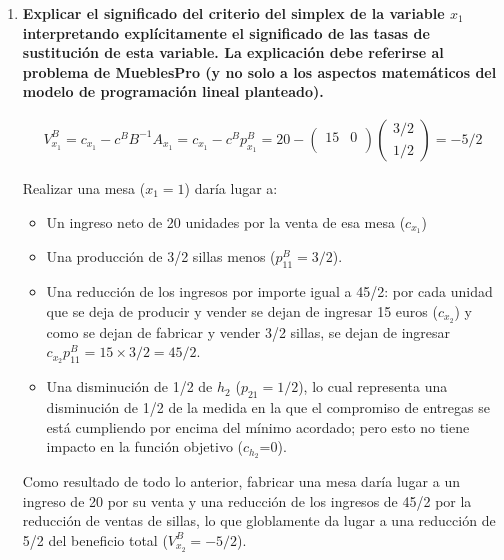 \begin{enumerate}
\item \textbf{Explicar el significado del criterio del simplex de la variable $x_1$ interpretando explícitamente el significado de las tasas de sustitución de esta variable. La explicación debe referirse al problema de MueblesPro (y no solo a los aspectos matemáticos del modelo de programación lineal planteado).}


\begin{equation}
\begin{split}
V^B_{x_1} = c_{x_1}-c^BB^{-1}A_{x_1} = c_{x_1}-c^Bp^B_{x_1}  = 20
 - \begin{pmatrix}
15 & 0\\
\end{pmatrix}
\begin{pmatrix}
3/2 \\ 
1/2 
\end{pmatrix}
 = 
-5/2 
\end{split}
\end{equation}

Realizar una mesa ($x_1 = 1$) daría lugar a:
\begin{itemize}
    \item Un ingreso neto de 20 unidades por la venta de esa mesa ($c_{x_1}$)
    \item Una producción de 3/2 sillas menos ($p^B_{11}=3/2$).
    \item Una reducción de los ingresos por importe igual a 45/2: por cada unidad que se deja de producir y vender se dejan de ingresar 15 euros ($c_{x_2}$) y como se dejan de fabricar y vender 3/2 sillas, se dejan de ingresar $c_{x_2}p^B_{11}=15\times 3/2 = 45/2$.
    \item Una disminución de 1/2 de $h_2$ ($p_{21}=1/2$), lo cual representa una disminución de 1/2 de la medida en la que el compromiso de entregas se está cumpliendo por encima del mínimo acordado; pero esto no tiene impacto en la función objetivo ($c_{h_2}$=0).
\end{itemize}

Como resultado de todo lo anterior, fabricar una mesa daría lugar a un ingreso de 20 por su venta y una reducción de los ingresos de 45/2 por la reducción de ventas de sillas, lo que globlamente da lugar a una reducción de 5/2 del beneficio total ($V^B_{x_2}=-5/2$).
        
\end{enumerate}

